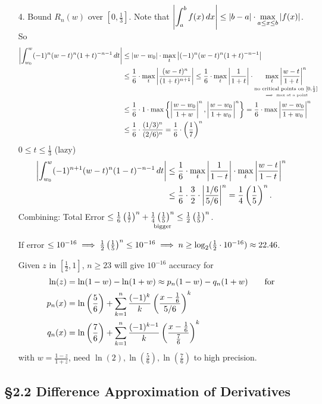 \documentclass[]{article}
\begin{document}
\begin{enumerate}
	\item[4.] Bound $R_n(w)$ over $[0,\frac13]$.
		Note that $\displaystyle\left|\int_a^b f(x)\,dx\right| \leq |b-a|\cdot\max_{a\leq x\leq b}|f(x)|$.
		So
		\begin{align*}
			\left|\int_{w_0}^w (-1)^n(w-t)^n(1+t)^{-n-1}\,dt\right|
				&\leq |w-w_0|\cdot\max_t\left|(-1)^n(w-t)^n(1+t)^{-n-1}\right| \\
				&\leq \frac16\cdot\max_t\left|\frac{(w-t)^n}{(1+t)^{n+1}}\right|
				\leq \frac16\cdot\max_t\left|\frac1{1+t}\right|\cdot\underset{\underset{\implies\text{ max at a point}}{\text{no critical points on }[0,\frac13]}}{\max_t\left|\frac{w-t}{1+t}\right|^n} \\
				&\leq \frac16 \cdot 1\cdot\max\left\{ \left|\frac{w-w_0}{1+w}\right|^n,\left|\frac{w-w_0}{1+w_0}\right|^n \right\}
				= \frac16\cdot\max\left|\frac{w-w_0}{1+w_0}\right|^n \\
				&\leq \frac16\cdot\frac{(1/3)^n}{(2/6)^n} 
				= \frac16\cdot\left(\frac17\right)^n
		\end{align*}
		$0\leq t\leq\frac13$ (lazy)
		\begin{align*}
			\left|\int_{w_0}^w (-1)^{n+1}(w-t)^n(1-t)^{-n-1}\,dt\right| 
			&\leq \frac16\cdot\max_t\left|\frac1{1-t}\right|\cdot\max_t\left|\frac{w-t}{1-t}\right|^n \\
			&\leq \frac16\cdot\frac32\cdot\left|\frac{1/6}{5/6}\right|^n
			= \frac14\left(\frac15\right)^n.
		\end{align*}
		Combining:
		Total Error $\leq \frac16\left(\frac17\right)^n + \underset{\text{bigger}}{\frac14\left(\frac15\right)^n} \leq \frac12\left(\frac15\right)^n$.
		
		If error $\leq 10^{-16} \implies \frac12\left(\frac15\right)^n\leq 10^{-16} \implies n\geq \log_2(\frac12\cdot10^{-16}) \approx 22.46$.
		
		Given $z$ in $[\frac12,1]$, $n\geq 23$ will give $10^{-16}$ accuracy for
		\begin{align*}
			\ln(z) &= \ln(1-w)-\ln(1+w) 
				   \approx p_n(1-w)-q_n(1+w) \qquad \text{for} \\
			p_n(x) &= \ln\left(\frac56\right) + \sum_{k=1}^n \frac{(-1)^k}k\left(\frac{x-\frac16}{5/6}\right)^k \\
			q_n(x) &= \ln\left(\frac76\right) + \sum_{k=1}^n\frac{(-1)^{k-1}}k\left(\frac{x-\frac16}{\frac76}\right)^k
		\end{align*}
		with $w = \frac{1-z}{1+z}$, need $\ln(2),\ln(\frac56),\ln(\frac76)$ to high precision.
\end{enumerate}

\subsection*{\S2.2 Difference Approximation of Derivatives}
\end{document}
